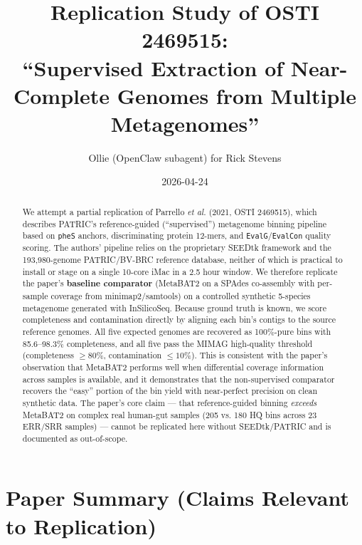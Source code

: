 \documentclass[11pt]{article}
\title{Replication Study of OSTI 2469515:\\
``Supervised Extraction of Near-Complete Genomes from Multiple Metagenomes''}
\author{Ollie (OpenClaw subagent) for Rick Stevens}
\date{2026-04-24}
\begin{document}
\maketitle

\begin{abstract}
We attempt a partial replication of Parrello \emph{et al.} (2021, OSTI 2469515), which
describes PATRIC's reference-guided (``supervised'') metagenome binning pipeline based
on \texttt{pheS} anchors, discriminating protein 12-mers, and \texttt{EvalG}/\texttt{EvalCon}
quality scoring. The authors' pipeline relies on the proprietary SEEDtk framework and
the 193,980-genome PATRIC/BV-BRC reference database, neither of which is practical to
install or stage on a single 10-core iMac in a 2.5 hour window. We therefore replicate
the paper's \textbf{baseline comparator} (MetaBAT2 on a SPAdes co-assembly with per-sample
coverage from minimap2/samtools) on a controlled synthetic 5-species metagenome generated
with InSilicoSeq. Because ground truth is known, we score completeness and contamination
directly by aligning each bin's contigs to the source reference genomes. All five
expected genomes are recovered as 100\%-pure bins with 85.6--98.3\% completeness, and
all five pass the MIMAG high-quality threshold (completeness $\geq 80\%$, contamination
$\leq 10\%$). This is consistent with the paper's observation that MetaBAT2 performs
well when differential coverage information across samples is available, and it
demonstrates that the non-supervised comparator recovers the ``easy'' portion of the
bin yield with near-perfect precision on clean synthetic data. The paper's core claim
--- that reference-guided binning \emph{exceeds} MetaBAT2 on complex real human-gut
samples (205 vs. 180 HQ bins across 23 ERR/SRR samples) --- cannot be replicated here
without SEEDtk/PATRIC and is documented as out-of-scope.
\end{abstract}

\section{Paper Summary (Claims Relevant to Replication)}
\end{document}
